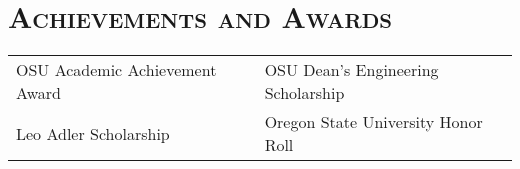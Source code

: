 \documentclass[letterpaper,10pt,titlepage]{article}
\begin{document}
\section*{\textsc{Achievements and Awards}}
\begin{tabularx}{\linewidth}{>{\centering\arraybackslash}X|>{\centering\arraybackslash}X}
OSU Academic Achievement Award & OSU Dean's Engineering Scholarship \\
Leo Adler Scholarship & Oregon State University Honor Roll\\
\end{tabularx}
\end{document}

